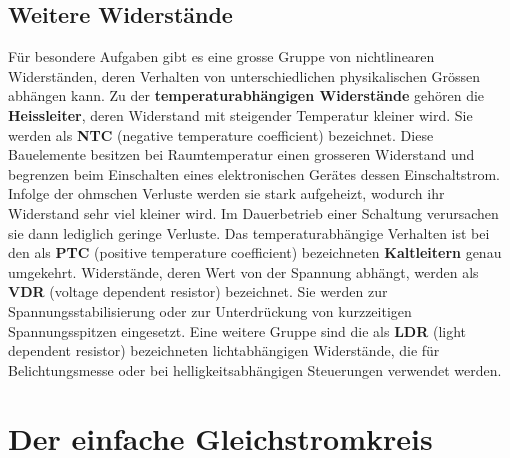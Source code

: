 \subsection{Weitere Widerstände}
Für besondere Aufgaben gibt es eine grosse Gruppe von nichtlinearen Widerständen, deren Verhalten von unterschiedlichen physikalischen Grössen abhängen kann.
\newline\newline
Zu der \textbf{temperaturabhängigen Widerstände} gehören die \textbf{Heissleiter}, deren Widerstand mit steigender Temperatur kleiner wird. Sie werden als \textbf{NTC} (negative temperature coefficient) bezeichnet. Diese Bauelemente besitzen bei Raumtemperatur einen grosseren Widerstand und begrenzen beim Einschalten eines elektronischen Gerätes dessen Einschaltstrom. Infolge der ohmschen Verluste werden sie stark aufgeheizt, wodurch ihr Widerstand sehr viel kleiner wird. Im Dauerbetrieb einer Schaltung verursachen sie dann lediglich geringe Verluste. Das temperaturabhängige Verhalten ist bei den als \textbf{PTC} (positive temperature coefficient) bezeichneten \textbf{Kaltleitern} genau umgekehrt.
\newline\newline
Widerstände, deren Wert von der Spannung abhängt, werden als \textbf{VDR} (voltage dependent resistor) bezeichnet. Sie werden zur Spannungsstabilisierung oder zur Unterdrückung von kurzzeitigen Spannungsspitzen eingesetzt.
\newline\newline
Eine weitere Gruppe sind die als \textbf{LDR} (light dependent resistor) bezeichneten lichtabhängigen Widerstände, die für Belichtungsmesse oder bei helligkeitsabhängigen Steuerungen verwendet werden.
\section{Der einfache Gleichstromkreis}
